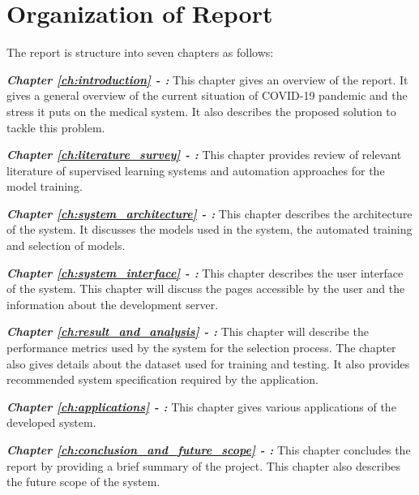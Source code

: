 \section{Organization of Report} \label{sec:organization_of_report}

The report is structure into seven chapters as follows:

\textbf{\textit{Chapter \ref{ch:introduction} - :}}
This chapter gives an overview of the report. It gives a general overview of the current situation of COVID-19 pandemic and the stress it puts on the medical system. It also describes the proposed solution to tackle this problem.

\textbf{\textit{Chapter \ref{ch:literature_survey} - :}}
This chapter provides review of relevant literature of supervised learning systems and automation approaches for the model training.

\textbf{\textit{Chapter \ref{ch:system_architecture} - :}}
This chapter describes the architecture of the system. It discusses the models used in the system, the automated training and selection of models.

\textbf{\textit{Chapter \ref{ch:system_interface} - :}}
This chapter describes the user interface of the system. This chapter will discuss the pages accessible by the user and the information about the development server.

\textbf{\textit{Chapter \ref{ch:result_and_analysis} - :}}
This chapter will describe the performance metrics used by the system for the selection process. The chapter also gives details about the dataset used for training and testing. It also provides recommended system specification required by the application.

\textbf{\textit{Chapter \ref{ch:applications} - :}}
This chapter gives various applications of the developed system.

\textbf{\textit{Chapter \ref{ch:conclusion_and_future_scope} - :}}
This chapter concludes the report by providing a brief summary of the project. This chapter also describes the future scope of the system.
